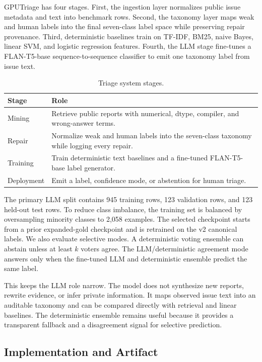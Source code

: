 \documentclass[sigplan,10pt]{acmart}
\newcommand{\system}{GPUTriage}
\begin{document}
\system{} has four stages. First, the ingestion layer normalizes public issue
metadata and text into benchmark rows. Second, the taxonomy layer maps weak and
human labels into the final seven-class label space while preserving repair
provenance. Third, deterministic baselines train on TF-IDF, BM25, naive Bayes,
linear SVM, and logistic regression features. Fourth, the LLM stage fine-tunes a
FLAN-T5-base sequence-to-sequence classifier to emit one taxonomy label from
issue text.

\begin{table}[t]
\centering
\caption{Triage system stages.}
\label{tab:pipeline}
\begin{tabular}{p{}p{}}
\toprule
Stage & Role \\
\midrule
Mining & Retrieve public reports with numerical, dtype, compiler, and
wrong-answer terms. \\
Repair & Normalize weak and human labels into the seven-class taxonomy while
logging every repair. \\
Training & Train deterministic text baselines and a fine-tuned FLAN-T5-base
label generator. \\
Deployment & Emit a label, confidence mode, or abstention for human triage. \\
\bottomrule
\end{tabular}
\end{table}

The primary LLM split contains 945 training rows, 123 validation rows, and 123
held-out test rows. To reduce class imbalance, the training set is balanced by
oversampling minority classes to 2,058 examples. The selected checkpoint starts
from a prior expanded-gold checkpoint and is retrained on the v2 canonical
labels. We also evaluate selective modes. A deterministic voting ensemble can
abstain unless at least $k$ voters agree. The LLM/deterministic agreement mode
answers only when the fine-tuned LLM and deterministic ensemble predict the same
label.

This keeps the LLM role narrow. The model does not synthesize new reports,
rewrite evidence, or infer private information. It maps observed issue text into
an auditable taxonomy and can be compared directly with retrieval and linear
baselines. The deterministic ensemble remains useful because it provides a
transparent fallback and a disagreement signal for selective prediction.

\subsection{Implementation and Artifact}
\end{document}
